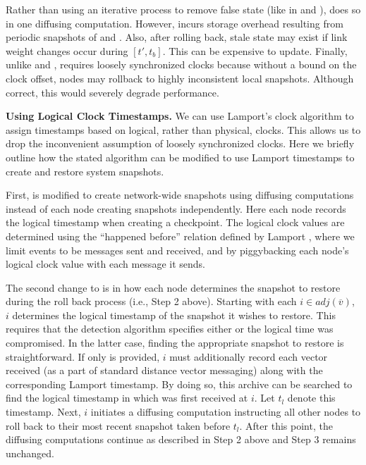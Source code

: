Rather than using an iterative process to remove false state (like in \second and \purges), \cpr does so in one diffusing computation.
However, \cpr incurs storage overhead resulting from periodic snapshots of \minv and \dmatrixs.  Also, after rolling back, stale state may exist if link weight changes occur during $[t',t_b]$.
This can be expensive to update.
Finally, unlike \purge and \seconds, \cpr requires loosely synchronized clocks because without a bound on the clock offset, nodes may rollback to highly inconsistent local snapshots.
Although correct, this would severely degrade \cpr performance.

{\bf Using Logical Clock Timestamps.}
We can use Lamport's clock algorithm  \cite{Lamport78} to assign timestamps based on logical, rather than physical, clocks.  This allows us to drop the inconvenient assumption of loosely 
synchronized clocks. Here we briefly outline how the stated \cpr algorithm can be modified to use Lamport timestamps to create and restore system snapshots.

First, \cpr is modified to create network-wide snapshots using diffusing computations instead of each node creating snapshots independently.   
Here each node records the logical timestamp when creating a checkpoint. 
The logical clock values are determined using the ``happened before'' relation defined by Lamport \cite{Lamport78}, where we limit events to be messages sent and received, and 
by piggybacking each node's logical clock value with each message it sends.  

The second change to \cpr is in how each node determines the snapshot to restore during the roll back process (i.e., Step 2 above). Starting with each $i \in adj(\overline{v})$, 
$i$ determines the logical timestamp of the snapshot it wishes to restore.  This requires that the detection algorithm specifies either \badvector or the logical time \bad was compromised. 
In the latter case, finding the appropriate snapshot to restore is straightforward.
If only \badvector is provided, $i$ must additionally record each \minv vector received (as a part of standard distance vector messaging) 
along with the corresponding Lamport timestamp.  By doing so, this archive can be searched
to find the logical timestamp in which \badvector was first received at $i$.  Let $t_l$ denote this timestamp.  Next, $i$ initiates a diffusing computation instructing all other nodes 
to roll back to their most recent snapshot taken before $t_l$.  After this point, the diffusing computations continue as described in Step 2 above and Step 3 
remains unchanged.

